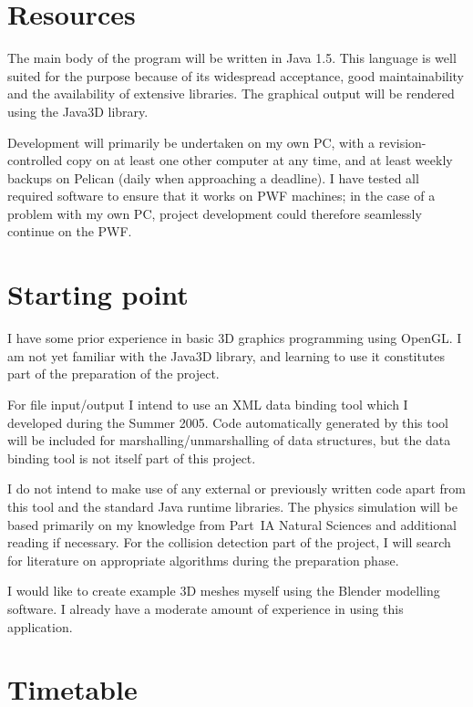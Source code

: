 \documentclass{article}
\begin{document}
\section*{Resources}

The main body of the program will be written in Java 1.5. This
language is well suited for the purpose because of its widespread
acceptance, good maintainability and the availability of extensive
libraries. The graphical output will be rendered using the Java3D
library.

Development will primarily be undertaken on my own PC, with a
revision-controlled copy on at least one other computer at any time,
and at least weekly backups on Pelican (daily when approaching a
deadline). I have tested all required software to ensure that it works
on PWF machines; in the case of a problem with my own PC, project
development could therefore seamlessly continue on the PWF.


\section*{Starting point}

I have some prior experience in basic 3D graphics programming using
OpenGL. I am not yet familiar with the Java3D library, and learning to
use it constitutes part of the preparation of the project.

For file input/output I intend to use an XML data binding tool which
I developed during the Summer 2005. Code automatically generated by
this tool will be included for marshalling/unmarshalling of data
structures, but the data binding tool is not itself part of this
project.

I do not intend to make use of any external or previously written code
apart from this tool and the standard Java runtime libraries.
The physics simulation will be based primarily on my knowledge from
Part~IA Natural Sciences and additional reading if necessary. For the
collision detection part of the project, I will search for literature
on appropriate algorithms during the preparation phase.

I would like to create example 3D meshes myself using the Blender
modelling software. I already have a moderate amount of experience
in using this application.


\section*{Timetable}
\end{document}
